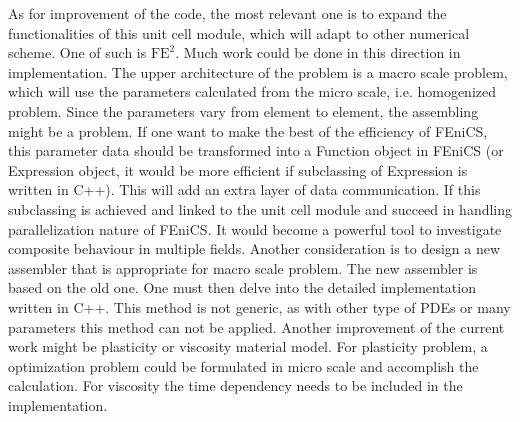 As for improvement of the code, the most relevant one is to expand the functionalities of this unit cell module, which will adapt to other numerical scheme. One of such is $\text{FE}^{2}$. Much work could be done in this direction in implementation. The upper architecture of the problem is a macro scale problem, which will use the parameters calculated from the micro scale, i.e. homogenized problem. Since the parameters vary from element to element, the assembling might be a problem. If one want to make the best of the efficiency of FEniCS, this parameter data should be transformed into a Function object in FEniCS (or Expression object, it would be more efficient if subclassing of Expression is written in C++). This will add an extra layer of data communication. If this subclassing is achieved and linked to the unit cell module and succeed in handling parallelization nature of FEniCS. It would become a powerful tool to investigate composite behaviour in multiple fields. Another consideration is to design a new assembler that is appropriate for macro scale problem. The new assembler is based on the old one. One must then delve into the detailed implementation written in C++. This method is not generic, as with other type of PDEs or many parameters this method can not be applied. Another improvement of the current work might be plasticity or viscosity material model. For plasticity problem, a optimization problem could be formulated in micro scale and accomplish the calculation. For viscosity the time dependency needs to be included in the implementation.

%
%
